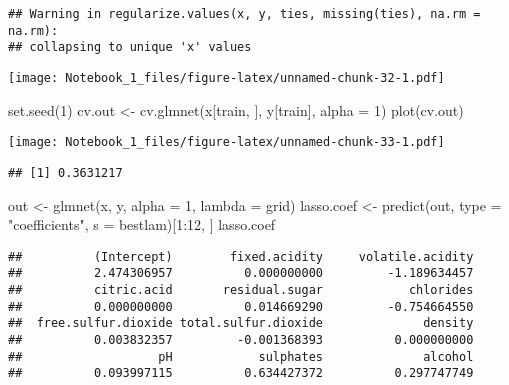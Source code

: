 \documentclass[
]{article}
\newenvironment{Shaded}{\begin{snugshade}}{\end{snugshade}}
\newcommand{\AttributeTok}[1]{\textcolor[rgb]{0.77,0.63,0.00}{#1}}
\newcommand{\DecValTok}[1]{\textcolor[rgb]{0.00,0.00,0.81}{#1}}
\newcommand{\FunctionTok}[1]{\textcolor[rgb]{0.00,0.00,0.00}{#1}}
\newcommand{\NormalTok}[1]{#1}
\newcommand{\OtherTok}[1]{\textcolor[rgb]{0.56,0.35,0.01}{#1}}
\newcommand{\SpecialCharTok}[1]{\textcolor[rgb]{0.00,0.00,0.00}{#1}}
\newcommand{\StringTok}[1]{\textcolor[rgb]{0.31,0.60,0.02}{#1}}
\begin{document}
\begin{verbatim}
## Warning in regularize.values(x, y, ties, missing(ties), na.rm = na.rm):
## collapsing to unique 'x' values
\end{verbatim}

\texttt{[image: Notebook\_1\_files/figure-latex/unnamed-chunk-32-1.pdf]}

\begin{Shaded}
\begin{Highlighting}[]
\FunctionTok{set.seed}\NormalTok{(}\DecValTok{1}\NormalTok{)}
\NormalTok{cv.out }\OtherTok{\textless{}{-}} \FunctionTok{cv.glmnet}\NormalTok{(x[train, ], y[train], }\AttributeTok{alpha =} \DecValTok{1}\NormalTok{)}
\FunctionTok{plot}\NormalTok{(cv.out)}
\end{Highlighting}
\end{Shaded}

\texttt{[image: Notebook\_1\_files/figure-latex/unnamed-chunk-33-1.pdf]}

\begin{Shaded}
\end{Shaded}

\begin{verbatim}
## [1] 0.3631217
\end{verbatim}

\begin{Shaded}
\begin{Highlighting}[]
\NormalTok{out }\OtherTok{\textless{}{-}} \FunctionTok{glmnet}\NormalTok{(x, y, }\AttributeTok{alpha =} \DecValTok{1}\NormalTok{, }\AttributeTok{lambda =}\NormalTok{ grid)}
\NormalTok{lasso.coef }\OtherTok{\textless{}{-}} \FunctionTok{predict}\NormalTok{(out, }\AttributeTok{type =} \StringTok{"coefficients"}\NormalTok{, }\AttributeTok{s =}\NormalTok{ bestlam)[}\DecValTok{1}\SpecialCharTok{:}\DecValTok{12}\NormalTok{, ]}
\NormalTok{lasso.coef}
\end{Highlighting}
\end{Shaded}

\begin{verbatim}
##          (Intercept)        fixed.acidity     volatile.acidity 
##          2.474306957          0.000000000         -1.189634457 
##          citric.acid       residual.sugar            chlorides 
##          0.000000000          0.014669290         -0.754664550 
##  free.sulfur.dioxide total.sulfur.dioxide              density 
##          0.003832357         -0.001368393          0.000000000 
##                   pH            sulphates              alcohol 
##          0.093997115          0.634427372          0.297747749
\end{verbatim}
\end{document}
